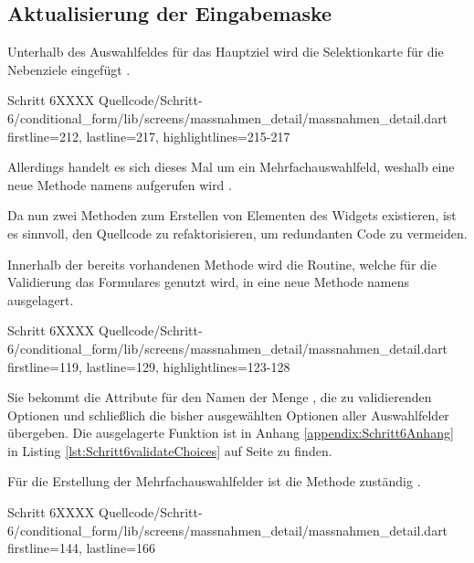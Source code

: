 \subsection{Aktualisierung der Eingabemaske}

Unterhalb des Auswahlfeldes für das Hauptziel wird die Selektionkarte für die Nebenziele eingefügt \Lst{\ref{lst:Schritt6buildMultiSelectionCardnebenzielsetzungLandChoices}}.
\begin{alexlisting}{Schritt 6}{XXXX}
  {Quellcode/Schritt-6/conditional_form/lib/screens/massnahmen_detail/massnahmen_detail.dart}
  {firstline=212, lastline=217, highlightlines={215-217}}
  \label{lst:Schritt6buildMultiSelectionCardnebenzielsetzungLandChoices}
\end{alexlisting}

Allerdings handelt es sich dieses Mal um ein Mehrfachauswahlfeld,
weshalb eine neue Methode namens  aufgerufen wird .

Da nun zwei Methoden zum Erstellen von Elementen des Widgets  existieren,
ist es sinnvoll,
den Quellcode zu refaktorisieren,
um redundanten Code zu vermeiden.



Innerhalb der bereits vorhandenen Methode  wird die Routine,
welche für die Validierung das Formulares genutzt wird,
in eine neue Methode namens   ausgelagert.
\begin{alexlisting}{Schritt 6}{XXXX}
  {Quellcode/Schritt-6/conditional_form/lib/screens/massnahmen_detail/massnahmen_detail.dart}
  {firstline=119, lastline=129, highlightlines={123-128}}
  \label{lst:Schritt6buildSelectionCard}
\end{alexlisting}

Sie bekommt die Attribute für den Namen der Menge ,
die zu validierenden Optionen 
und schließlich die bisher ausgewählten Optionen aller Auswahlfelder  übergeben.
Die ausgelagerte Funktion ist in Anhang \ref{appendix:Schritt6Anhang} in Listing \ref{lst:Schritt6validateChoices} auf Seite \pageref{lst:Schritt6validateChoices} zu finden.


Für die Erstellung der Mehrfachauswahlfelder ist die Methode  zuständig \Lst{\ref{lst:Schritt6buildMultiSelectionCard}}.

\begin{alexlisting}{Schritt 6}{XXXX}
  {Quellcode/Schritt-6/conditional_form/lib/screens/massnahmen_detail/massnahmen_detail.dart}
  {firstline=144, lastline=166}
  \label{lst:Schritt6buildMultiSelectionCard}
\end{alexlisting}

